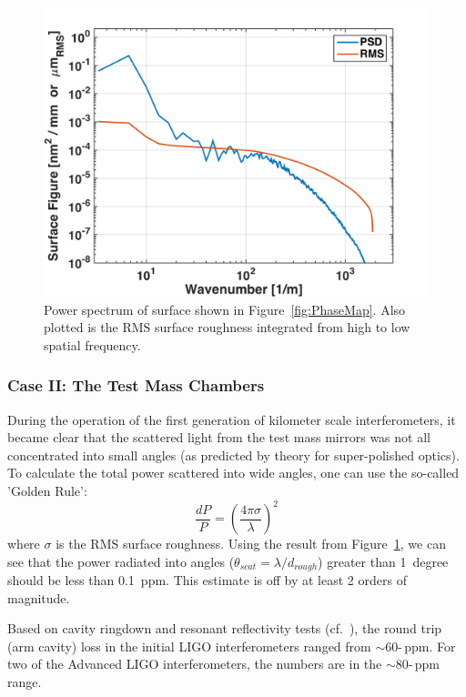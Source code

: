 \begin{figure}[h]
  \centering
    \includegraphics[width=\columnwidth]{Figures/ETMpsd.png}
    \caption{Power spectrum of surface shown in Figure~\ref{fig:PhaseMap}. Also
    plotted is the RMS surface roughness integrated from high to low
    spatial frequency.}
    \label{fig:PhaseMapPSD}
\end{figure}

\subsubsection{Case II: The Test Mass Chambers}
During the operation of the first generation of kilometer scale interferometers,
it became clear that the scattered light from the test mass mirrors was not
all concentrated into small angles (as predicted by theory for super-polished
optics). To calculate the total power scattered into wide angles, one can use the
so-called 'Golden Rule':
\begin{equation}
\frac{dP}{P} = \left( \frac{4 \pi \sigma}{\lambda} \right)^2
\end{equation}
where $\sigma$ is the RMS surface roughness. Using the result from
Figure~\ref{fig:PhaseMapPSD}, we can see that the power radiated into
angles ($\theta_{scat} = \lambda / d_{rough}$) greater than 1~degree should be
less than 0.1~ppm. This estimate is off by at least 2 orders of magnitude.

Based on cavity ringdown and resonant reflectivity tests (cf.~\cite{Isogai2013}),
the round trip (arm cavity) loss in the initial LIGO interferometers ranged from
$\sim$60\--\,ppm. For two of the Advanced LIGO interferometers, the numbers
are in the $\sim$80\--\,ppm range.

